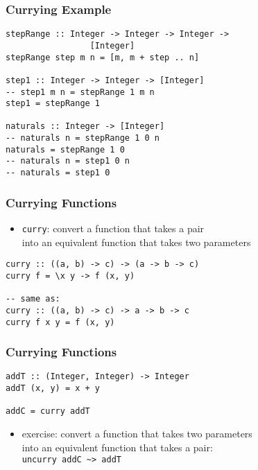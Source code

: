\documentclass[dvipsnames]{beamer}
\theoremstyle{plain}
\begin{document}
\begin{frame}[fragile]
  \frametitle{Currying Example}

  \begin{exampleblock}{}
    \begin{lstlisting}
stepRange :: Integer -> Integer -> Integer ->
                 [Integer]
stepRange step m n = [m, m + step .. n]

step1 :: Integer -> Integer -> [Integer]
-- step1 m n = stepRange 1 m n
step1 = stepRange 1

naturals :: Integer -> [Integer]
-- naturals n = stepRange 1 0 n
naturals = stepRange 1 0
-- naturals n = step1 0 n
-- naturals = step1 0
    \end{lstlisting}
  \end{exampleblock}
\end{frame}

\begin{frame}[fragile]
  \frametitle{Currying Functions}

  \begin{itemize}
    \item \lstinline|curry|: convert a function that takes a pair\\
      into an equivalent function that takes two parameters
  \end{itemize}

  \begin{lstlisting}[deletekeywords={curry}]
curry :: ((a, b) -> c) -> (a -> b -> c)
curry f = \x y -> f (x, y)

-- same as:
curry :: ((a, b) -> c) -> a -> b -> c
curry f x y = f (x, y)
  \end{lstlisting}
\end{frame}

\begin{frame}[fragile]
  \frametitle{Currying Functions}

  \begin{exampleblock}{}
    \begin{lstlisting}
addT :: (Integer, Integer) -> Integer
addT (x, y) = x + y

addC = curry addT
    \end{lstlisting}
  \end{exampleblock}

  \begin{itemize}
    \item exercise: convert a function that takes two parameters\\
      into an equivalent function that takes a pair:\\
      \lstinline|uncurry addC ~> addT|
  \end{itemize}
\end{frame}
\end{document}
